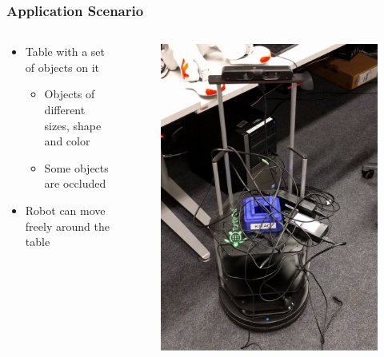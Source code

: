 \documentclass[t]{beamer} %
\begin{document}
\begin{frame}
	\frametitle{ Application Scenario }
	\begin{columns}
		\begin{column}{0.65\textwidth}
			\begin{itemize}
				\item Table with a set of objects on it
				\begin{itemize}
					\item Objects of different sizes, shape and color
					\item Some objects are occluded
				\end{itemize}
				\item Robot can move freely around the table
			\end{itemize}		
		\end{column}
		\begin{column}{0.3\textwidth}
			\begin{figure}[h]
				\vspace{-0.5cm}
				\includegraphics[width=1\textwidth]{src/turtle.png}
			\end{figure}
		\end{column}
	\end{columns}
\end{frame}
\end{document}
